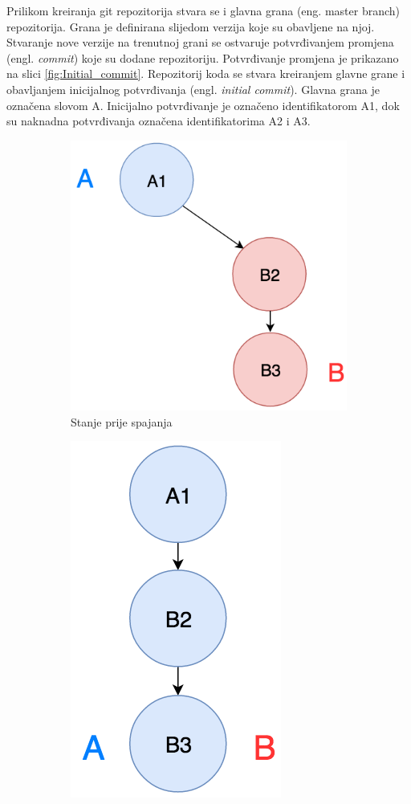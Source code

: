\documentclass[times, utf8, diplomski, numeric]{fer}
\newcommand{\eng}[1]{(engl. \textit{#1})}
\begin{document}
Prilikom kreiranja git repozitorija stvara se i glavna grana (eng. master branch) repozitorija. Grana je definirana slijedom verzija koje su obavljene na njoj. Stvaranje nove verzije na trenutnoj grani se ostvaruje potvrđivanjem promjena \eng{commit} koje su dodane repozitoriju. Potvrđivanje promjena je prikazano na slici \ref{fig:Initial_commit}. Repozitorij koda se stvara kreiranjem glavne grane i obavljanjem inicijalnog potvrđivanja \eng{initial commit}. Glavna grana je označena slovom A. Inicijalno potvrđivanje je označeno identifikatorom A1, dok su naknadna potvrđivanja označena identifikatorima A2 i A3.

\begin{figure}
\centering
\begin{subfigure}{.49\textwidth}
\centering
\includegraphics[scale=0.6]{FastForwardA}
\caption{Stanje prije spajanja}
\label{fig:FastForwardA}
\end{subfigure}
\begin{subfigure}{.49\textwidth}
\centering
\includegraphics[scale=0.6]{FastForwardB}

\end{subfigure}
\end{figure}
\end{document}
